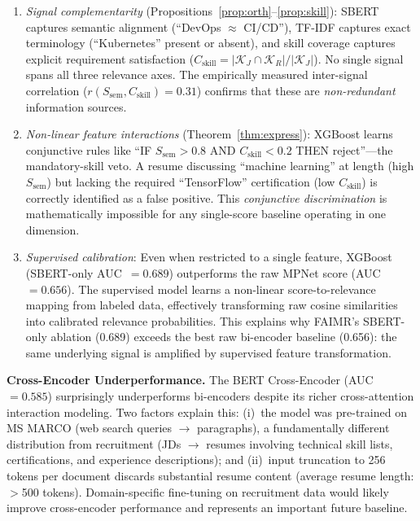 \documentclass{svproc}
\begin{document}
\begin{enumerate}
    \item \textit{Signal complementarity} (Propositions~\ref{prop:orth}--\ref{prop:skill}): SBERT captures semantic alignment (``DevOps $\approx$ CI/CD''), TF-IDF captures exact terminology (``Kubernetes'' present or absent), and skill coverage captures explicit requirement satisfaction ($C_\text{skill} = |\mathcal{K}_J \cap \mathcal{K}_R|/|\mathcal{K}_J|$). No single signal spans all three relevance axes. The empirically measured inter-signal correlation ($r(S_\text{sem}, C_\text{skill}) = 0.31$) confirms that these are \textit{non-redundant} information sources.

    \item \textit{Non-linear feature interactions} (Theorem~\ref{thm:express}): XGBoost learns conjunctive rules like ``IF $S_\text{sem} > 0.8$ AND $C_\text{skill} < 0.2$ THEN reject''---the mandatory-skill veto. A resume discussing ``machine learning'' at length (high $S_\text{sem}$) but lacking the required ``TensorFlow'' certification (low $C_\text{skill}$) is correctly identified as a false positive. This \textit{conjunctive discrimination} is mathematically impossible for any single-score baseline operating in one dimension.

    \item \textit{Supervised calibration}: Even when restricted to a single feature, XGBoost (SBERT-only AUC~$= 0.689$) outperforms the raw MPNet score (AUC~$= 0.656$). The supervised model learns a non-linear score-to-relevance mapping from labeled data, effectively transforming raw cosine similarities into calibrated relevance probabilities. This explains why FAIMR's SBERT-only ablation (0.689) exceeds the best raw bi-encoder baseline (0.656): the same underlying signal is amplified by supervised feature transformation.
\end{enumerate}

\textbf{Cross-Encoder Underperformance.} The BERT Cross-Encoder (AUC~$= 0.585$) surprisingly underperforms bi-encoders despite its richer cross-attention interaction modeling. Two factors explain this: (i)~the model was pre-trained on MS MARCO (web search queries $\to$ paragraphs), a fundamentally different distribution from recruitment (JDs $\to$ resumes involving technical skill lists, certifications, and experience descriptions); and (ii)~input truncation to 256 tokens per document discards substantial resume content (average resume length: $>$500 tokens). Domain-specific fine-tuning on recruitment data would likely improve cross-encoder performance and represents an important future baseline.
\end{document}
